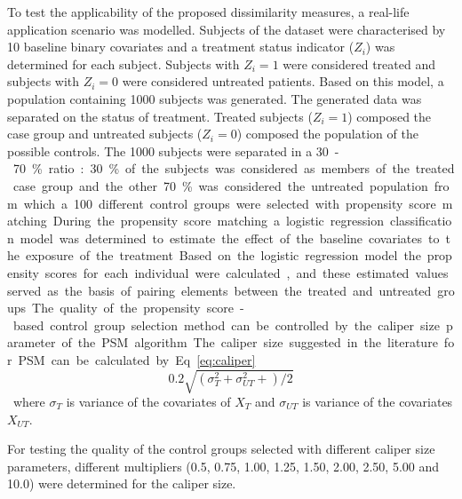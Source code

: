 		To test the applicability of the proposed dissimilarity measures, a real-life application scenario was modelled. Subjects of the dataset were characterised by 10 baseline binary covariates and a treatment status indicator ($Z_i$) was determined for each subject. Subjects with $Z_i=1$ were considered treated and subjects with $Z_i=0$ were considered untreated patients. Based on this model, a population containing 1000 subjects was generated. The generated data was separated on the status of treatment. Treated subjects ($Z_i=1$) composed the case group and untreated subjects ($Z_i=0$) composed the population of the possible controls. The 1000 subjects were separated in a  \SI{30}-\SI{70}{\percent} ratio: \SI{30}{\percent} of the subjects was considered as members of the treated case group and the other \SI{70}{\percent} was considered the untreated population from which a 100 different control groups were selected with propensity score matching. During the propensity score matching a logistic regression classification model was determined to estimate the effect of the baseline covariates to the exposure of the treatment. Based on the logistic regression model the propensity scores for each individual were calculated, and these estimated values served as the basis of pairing elements between the treated and untreated groups.
								
		The quality of the propensity score-based control group selection method can be controlled by the caliper size parameter of the PSM algorithm. The caliper size suggested in the literature for PSM can be calculated by Eq. \ref{eq:caliper} \cite{austin2011introduction}. 
								
		\begin{equation}
			0.2\sqrt{(\sigma_T^2+\sigma_{UT}^2+)/2}
			\label{eq:caliper}
		\end{equation}
		where $\sigma_T$ is variance of the covariates of $X_T$ and $\sigma_{UT}$ is variance of the covariates $X_{UT}$. 
  
		For testing the quality of the control groups selected with different caliper size parameters, different multipliers (0.5, 0.75, 1.00, 1.25, 1.50, 2.00, 2.50, 5.00 and 10.0) were determined for the caliper size. 
  
								
		
